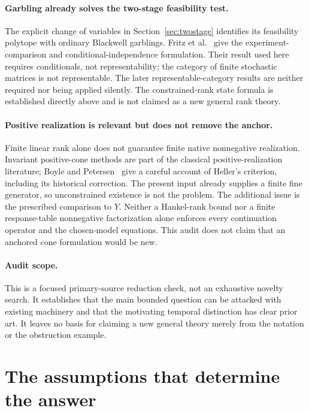 \documentclass[11pt]{article}
\begin{document}
\paragraph{Garbling already solves the two-stage feasibility test.}
The explicit change of variables in Section~\ref{sec:twostage} identifies its feasibility polytope with ordinary Blackwell garblings. Fritz et al.~\cite[Section 5.1 and Theorem 5.4]{FGPR2023} give the experiment-comparison and conditional-independence formulation. Their result used here requires conditionals, not representability; the category of finite stochastic matrices is not representable. The later representable-category results are neither required nor being applied silently. The constrained-rank state formula is established directly above and is not claimed as a new general rank theory.

\paragraph{Positive realization is relevant but does not remove the anchor.}
Finite linear rank alone does not guarantee finite native nonnegative realization. Invariant positive-cone methods are part of the classical positive-realization literature; Boyle and Petersen~\cite[Theorem 4.40]{BP2011} give a careful account of Heller's criterion, including its historical correction. The present input already supplies a finite fine generator, so unconstrained existence is not the problem. The additional issue is the prescribed comparison to $Y$. Neither a Hankel-rank bound nor a finite response-table nonnegative factorization alone enforces every continuation operator and the chosen-model equations. This audit does not claim that an anchored cone formulation would be new.

\paragraph{Audit scope.}
This is a focused primary-source reduction check, not an exhaustive novelty search. It establishes that the main bounded question can be attacked with existing machinery and that the motivating temporal distinction has clear prior art. It leaves no basis for claiming a new general theory merely from the notation or the obstruction example.

\section{The assumptions that determine the answer}
\label{sec:choices}
\end{document}
